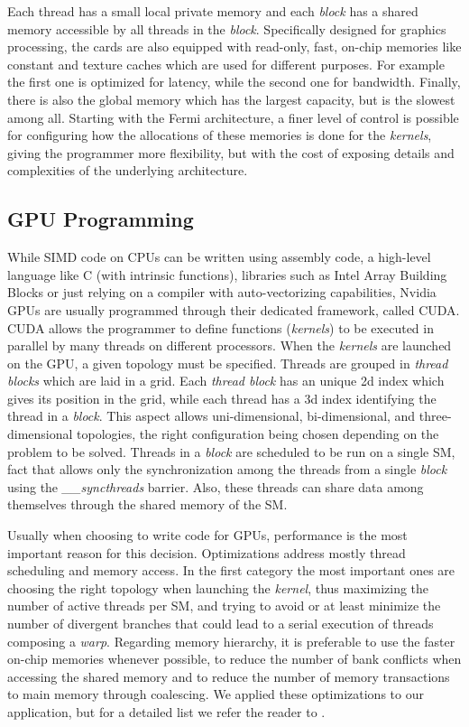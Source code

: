 Each thread has a small local private memory and each \textit{block} has a
shared memory accessible by all threads in the \textit{block}. Specifically
designed for graphics processing, the cards are also equipped with read-only,
fast, on-chip memories like constant and texture caches which are used for
different purposes. For example the first one is optimized for latency, while
the second one for bandwidth. Finally, there is also the global memory which has
the largest capacity, but is the slowest among all. Starting with the Fermi
architecture, a finer level of control is possible for configuring how the
allocations of these memories is done for the \textit{kernels}, giving the
programmer more flexibility, but with the cost of exposing details and
complexities of the underlying architecture.

\subsection{GPU Programming}

While SIMD code on CPUs can be written using assembly code, a high-level
language like C (with intrinsic functions), libraries such as Intel Array
Building Blocks or just relying on a compiler with auto-vectorizing
capabilities, Nvidia GPUs are usually  programmed through their dedicated
framework, called CUDA. CUDA allows the programmer to define functions
(\textit{kernels}) to be executed in parallel by many threads on different
processors. When the \textit{kernels} are launched on the GPU, a given topology
must be specified. Threads are grouped in \textit{thread blocks} which are laid
in a grid. Each \textit{thread block} has an unique 2d index which gives its
position in the grid, while each thread has a 3d index identifying the thread in
a \textit{block}. This aspect allows uni-dimensional, bi-dimensional, and
three-dimensional topologies, the right configuration being chosen depending on
the problem to be solved. Threads in a \textit{block} are scheduled to be run on
a single SM, fact that allows only the synchronization among the threads from a
single \textit{block} using the \emph{\_\_syncthreads} barrier. Also, these
threads can share data among themselves through the shared memory of the SM.

Usually when choosing to write code for GPUs, performance is the most important
reason for this decision. Optimizations address mostly thread scheduling and
memory access. In the first category the most important ones are choosing the
right topology when launching the \textit{kernel}, thus maximizing the number of
active threads per SM, and trying to avoid or at least minimize the number of
divergent branches that could lead to a serial execution of threads composing a
\textit{warp}. Regarding memory hierarchy, it is preferable to use the faster 
on-chip memories whenever possible, to reduce the number of bank conflicts when
accessing the shared memory and to reduce the number of memory transactions to
main memory through coalescing. We applied these optimizations to our
application, but for a detailed list we refer the reader to \cite{cuda}.

